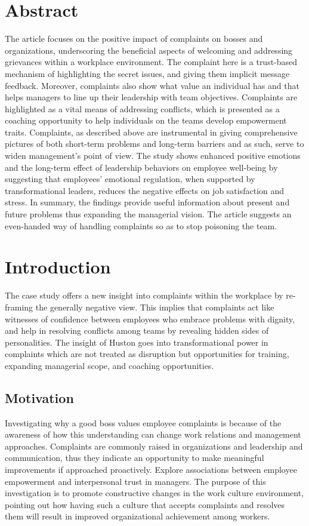 \documentclass[a4paper,12pt]{report}
\begin{document}
\section{Abstract}
The article focuses on the positive impact of complaints on bosses and organizations, underscoring the beneficial aspects of welcoming and addressing grievances within a workplace environment. The complaint here is a trust-based mechanism of highlighting the secret issues, and giving them implicit message feedback. Moreover, complaints also show what value an individual has and that helps managers to line up their leadership with team objectives. Complaints are highlighted as a vital means of addressing conflicts, which is presented as a coaching opportunity to help individuals on the teams develop empowerment traits\cite{case_study}. Complaints, as described above are instrumental in giving comprehensive pictures of both short-term problems and long-term barriers and as such, serve to widen management's point of view\cite{case_study}. The study shows enhanced positive emotions and the long-term effect of leadership behaviors on employee well-being by suggesting that employees' emotional regulation, when supported by transformational leaders, reduces the negative effects on job satisfaction and stress\cite{workplace_emotions}. In summary, the findings provide useful information about present and future problems thus expanding the managerial vision. The article suggests an even-handed way of handling complaints so as to stop poisoning the team.
\newpage
\section{Introduction}
The case study offers a new insight into complaints within the workplace by re-framing the generally negative view. This implies that complaints act like witnesses of confidence between employees who embrace problems with dignity, and help in resolving conflicts among teams by revealing hidden sides of personalities. The insight of Huston goes into transformational power in complaints which are not treated as disruption but opportunities for training, expanding managerial scope, and coaching opportunities\cite{case_study}. 

\subsection{Motivation}
Investigating why a good boss values employee complaints is because of the awareness of how this understanding can change work relations and management approaches. Complaints are commonly raised in organizations and leadership and communication, thus they indicate an opportunity to make meaningful improvements if approached proactively. Explore associations between employee empowerment and interpersonal trust in managers\cite{employee_manager}. The purpose of this investigation is to promote constructive changes in the work culture environment, pointing out how having such a culture that accepts complaints and resolves them will result in improved organizational achievement among workers.    
\end{document}
